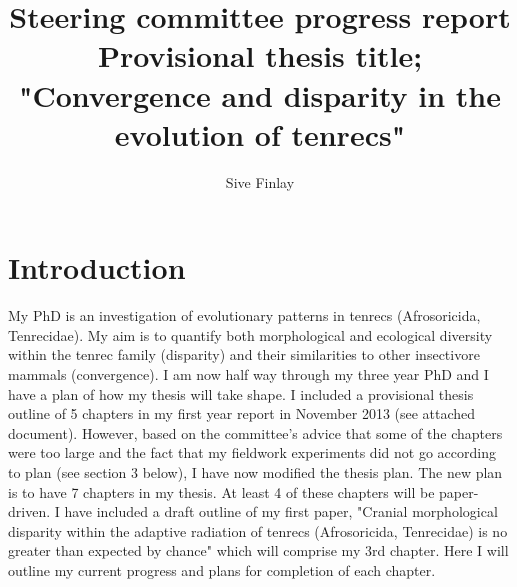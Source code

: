\documentclass[12pt,a4paper]{article}
\begin{document}
\title{Steering committee progress report\\
Provisional thesis title; "Convergence and disparity in the evolution of tenrecs"}
\author{Sive Finlay}
\maketitle

\section{Introduction}
My PhD is an investigation of evolutionary patterns in tenrecs (Afrosoricida, Tenrecidae). My aim is to quantify both morphological and ecological diversity within the tenrec family (disparity) and their similarities to other insectivore mammals (convergence). 
I am now half way through my three year PhD and I have a plan of how my thesis will take shape. I included a provisional thesis outline of 5 chapters in my first year report in November 2013 (see attached document). However, based on the committee's advice that some of the chapters were too large and the fact that my fieldwork experiments did not go according to plan (see section 3 below), I have now modified the thesis plan.  The new plan is to have 7 chapters in my thesis. At least 4 of these chapters will be paper-driven. I have included a draft outline of my first paper, "Cranial morphological disparity within the adaptive radiation of tenrecs (Afrosoricida, Tenrecidae) is no greater than expected by chance" which will comprise my 3rd chapter.
Here I will outline my current progress and plans for completion of each chapter. 
\end{document}
